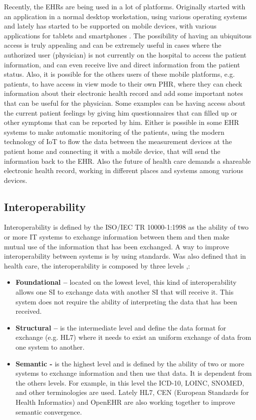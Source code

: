 \documentclass[mim_thesis.tex]{subfiles}
\begin{document}
Recently, the EHRs are being used in a lot of platforms. Originally started with an application in a normal desktop workstation, using various operating systems and lately has started to be supported on mobile devices, with various applications for tablets and smartphones \citep{evans2016electronic}. The possibility of having an ubiquitous access is truly appealing and can be extremely useful in cases where the authorized user (physician) is not currently on the hospital to access the patient information, and can even receive live and direct information from the patient status. Also, it is possible for the others users of these mobile platforms, e.g. patients, to have access in view mode to their own \ac{PHR}, where they can check information about their electronic health record and add some important notes that can be useful for the physician. Some examples can be having access about the current patient feelings by giving him questionnaires that can filled up or other symptoms that can be reported by him. Either is possible in some EHR systems to make automatic monitoring of the patients, using the modern technology of \ac{IoT} to flow the data between the measurement devices at the patient home and connecting it with a mobile device, that will send the information back to the EHR. Also the future of health care demands a shareable electronic health record, working in different places and systems among various devices. 

\subsection{Interoperability}
Interoperability is defined by the ISO/IEC TR 10000-1:1998 \citep{ISO2013} as the ability of two or more IT systems to exchange information between them and then make mutual use of the information that has been exchanged. A way to improve interoperability between systems is by using standards. Was also defined that in health care, the interoperability is composed by three levels \citep{HIMSS2013},\citep{tolk2003levels}: 


\begin{itemize}
\item \textbf{Foundational –} located on the lowest level, this kind of interoperability allows one SI to exchange data with another SI that will receive it. This system does not require the ability of interpreting the data that has been received.
\item \textbf{Structural –}  is the intermediate level and define the data format for exchange (e.g. HL7) where it needs to exist an uniform exchange of data from one system to another.
\item \textbf{Semantic -} is the highest level and is defined by the ability of two or more systems to exchange information and then use that data. It is dependent from the others levels. For example, in this level the ICD-10, LOINC, SNOMED, and other terminologies are used. Lately HL7, CEN (European Standards for Health Informatics) and OpenEHR are also working together to improve semantic convergence.
\end{itemize}
\end{document}
